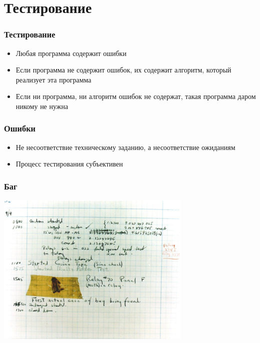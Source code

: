 \documentclass{../../slides-style}
\begin{document}
    \begin{frame}[plain]
        \titlepage
    \end{frame}

    \section{Тестирование}

    \begin{frame}
        \frametitle{Тестирование}
        \begin{itemize}
            \item Любая программа содержит ошибки
            \item Если программа не содержит ошибок, их содержит алгоритм, который реализует эта программа
            \item Если ни программа, ни алгоритм ошибок не содержат, такая программа даром никому не нужна
        \end{itemize}
    \end{frame}

    \begin{frame}
        \frametitle{Ошибки}
        \begin{itemize}
            \item Не несоответствие техническому заданию, а несоответствие ожиданиям
            \item Процесс тестирования субъективен
        \end{itemize}
    \end{frame}

    \begin{frame}
        \frametitle{Баг}
        \begin{center}
            \includegraphics[width=0.7\textwidth]{bug.png}
        \end{center}
    \end{frame}
\end{document}
